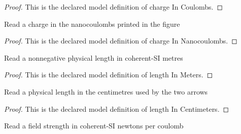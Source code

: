 \begin{proof}
  This is the declared model definition of charge In Coulombs.
\end{proof}
\begin{definition}
  \label{def:physics:phyx-mini-0914:phyxminiproblems-problemphyxmini0914-chargeinnanocoulombs}
  Read a charge in the nanocoulombs printed in the figure
\end{definition}
\begin{proof}
  This is the declared model definition of charge In Nanocoulombs.
\end{proof}
\begin{definition}
  \label{def:physics:phyx-mini-0914:phyxminiproblems-problemphyxmini0914-lengthinmeters}
  Read a nonnegative physical length in coherent-SI metres
\end{definition}
\begin{proof}
  This is the declared model definition of length In Meters.
\end{proof}
\begin{definition}
  \label{def:physics:phyx-mini-0914:phyxminiproblems-problemphyxmini0914-lengthincentimeters}
  Read a physical length in the centimetres used by the two arrows
\end{definition}
\begin{proof}
  This is the declared model definition of length In Centimeters.
\end{proof}
\begin{definition}
  \label{def:physics:phyx-mini-0914:phyxminiproblems-problemphyxmini0914-electricfieldstrengthinnewtonspercoulomb}
  Read a field strength in coherent-SI newtons per coulomb
\end{definition}
